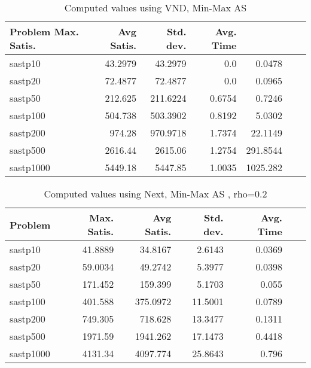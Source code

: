 \documentclass{article}
\begin{document}
\begin{table}[b!]
  \vspace{-6mm}%
  \caption{Computed values using VND, Min-Max AS}
  \label{tab:conf6}
  \setlength{\tabcolsep}{1.4mm}
  \centering
  \begin{tabular}{lrrrrrr}
    \bfseries Problem 
    \bfseries Max. Satis. &
    \bfseries Avg Satis. &
    \bfseries Std. dev. &
    \bfseries Avg. Time 
    \\\hline
    sastp10 & 43.2979 & 43.2979 & 0.0 & 0.0478 \\ 
    sastp20 & 72.4877 & 72.4877 & 0.0 & 0.0965 \\ 
    sastp50 & 212.625 & 211.6224 & 0.6754 & 0.7246 \\ 
    sastp100 & 504.738 & 503.3902 & 0.8192 & 5.0302 \\ 
    sastp200 & 974.28 & 970.9718 & 1.7374 & 22.1149 \\ 
    sastp500 & 2616.44 & 2615.06 & 1.2754 & 291.8544 \\ 
    sastp1000 & 5449.18 & 5447.85 & 1.0035 & 1025.282
    \\\hline
  \end{tabular}

\end{table}

\begin{table}[b!]
  \vspace{-6mm}%
  \caption{Computed values using Next, Min-Max AS , rho=0.2}
  \label{tab:conf7}
  \setlength{\tabcolsep}{1.4mm}
  \centering
  \begin{tabular}{lrrrrrr}
    \bfseries Problem &
    \bfseries Max. Satis. &
    \bfseries Avg Satis. &
    \bfseries Std. dev. &
    \bfseries Avg. Time 
    \\\hline
   sastp10 & 41.8889 & 34.8167 & 2.6143 & 0.0369 \\ 
   sastp20 & 59.0034 & 49.2742 & 5.3977 & 0.0398 \\ 
   sastp50 & 171.452 & 159.399 & 5.1703 & 0.055 \\ 
   sastp100 & 401.588 & 375.0972 & 11.5001 & 0.0789 \\ 
   sastp200 & 749.305 & 718.628 & 13.3477 & 0.1311 \\ 
   sastp500 & 1971.59 & 1941.262 & 17.1473 & 0.4418 \\ 
   sastp1000 & 4131.34 & 4097.774 & 25.8643 & 0.796

    \\\hline
  \end{tabular}

\end{table}
\end{document}
